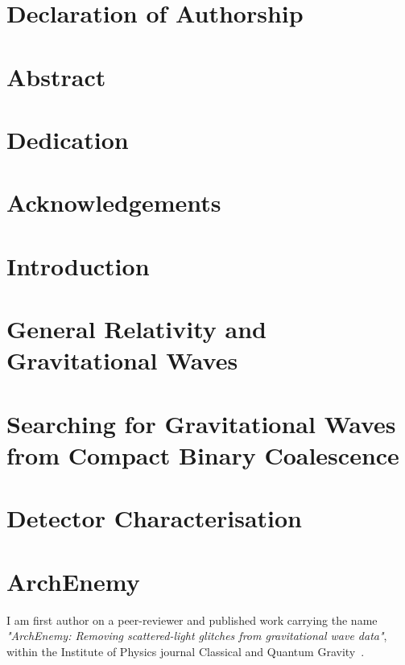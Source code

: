 \documentclass[12pt,twoside]{report} %
\begin{document}


\chapter*{Declaration of Authorship}


\chapter*{Abstract}


\chapter*{Dedication}


\chapter*{Acknowledgements}


\tableofcontents

\chapter*{Introduction}


\chapter{General Relativity and Gravitational Waves}


\chapter{Searching for Gravitational Waves from Compact Binary Coalescence}


\chapter{Detector Characterisation}


\chapter{ArchEnemy}
I am first author on a peer-reviewer and published work carrying the name \textit{"ArchEnemy: Removing scattered-light glitches from gravitational wave data"}, within the Institute of Physics journal Classical and Quantum Gravity~\cite{ArchEnemy}.

\end{document}
